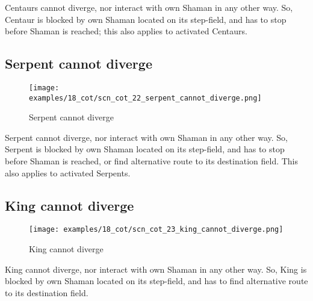 \vspace*{-0.5\baselineskip}
Centaurs cannot diverge, nor interact with own Shaman in any other way. So, Centaur
is blocked by own Shaman located on its step-field, and has to stop before Shaman
is reached; this also applies to activated Centaurs.

\clearpage %

\subsection*{Serpent cannot diverge}
\label{sec:Conquest of Tlalocan/Divergence/Serpent cannot diverge}

\vspace*{-1.4\baselineskip}
\noindent
\begin{figure}[!h]
\texttt{[image: examples/18\_cot/scn\_cot\_22\_serpent\_cannot\_diverge.png]}
\vspace*{-1.3\baselineskip}
\caption{Serpent cannot diverge}
\label{fig:scn_cot_22_serpent_cannot_diverge}
\end{figure}

\vspace*{-0.5\baselineskip}
Serpent cannot diverge, nor interact with own Shaman in any other way. So, Serpent
is blocked by own Shaman located on its step-field, and has to stop before Shaman
is reached, or find alternative route to its destination field. This also applies
to activated Serpents.


\subsection*{King cannot diverge}
\label{sec:Conquest of Tlalocan/Divergence/King cannot diverge}

\noindent
\begin{wrapfigure}[6]{l}{0.4\textwidth}
\centering
\texttt{[image: examples/18\_cot/scn\_cot\_23\_king\_cannot\_diverge.png]}
\caption{King cannot diverge}
\label{fig:scn_cot_23_king_cannot_diverge}
\end{wrapfigure}
King cannot diverge, nor interact with own Shaman in any other way. So, King is
blocked by own Shaman located on its step-field, and has to find alternative
route to its destination field.

